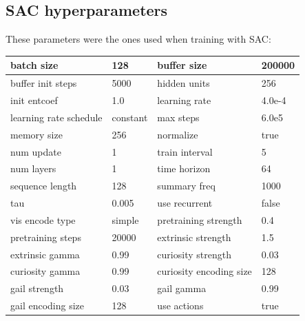 \subsection{SAC hyperparameters}

These parameters were the ones used when training with SAC:
\begin{center}
	\begin{tabular}{ | m{4cm} | m{2.5cm}||m{4cm} | m{2.5cm} | } 
		\hline
			batch size & 128 & buffer size & 200000\\ 
		\hline
			buffer init steps & 5000 & hidden units & 256\\
		\hline
			init entcoef & 1.0 & learning rate & 4.0e-4\\
		\hline
			learning rate schedule & constant & max steps & 6.0e5\\
		\hline
			memory size & 256 & normalize & true\\
		\hline
			num update & 1 & train interval & 5\\
		\hline
			num layers & 1 & time horizon & 64\\
		\hline
			sequence length & 128 & summary freq & 1000\\
		\hline
			tau & 0.005 & use recurrent & false\\
		\hline
			vis encode type & simple & pretraining strength & 0.4\\
		\hline
			pretraining steps & 20000 & extrinsic strength & 1.5\\
		\hline
			extrinsic gamma & 0.99 & curiosity strength & 0.03\\
		\hline
			curiosity gamma & 0.99 & curiosity encoding size & 128\\
		\hline
			gail strength & 0.03 & gail gamma & 0.99\\
		\hline
			gail encoding size & 128 & use actions & true\\
		\hline
	\end{tabular}
\end{center}
